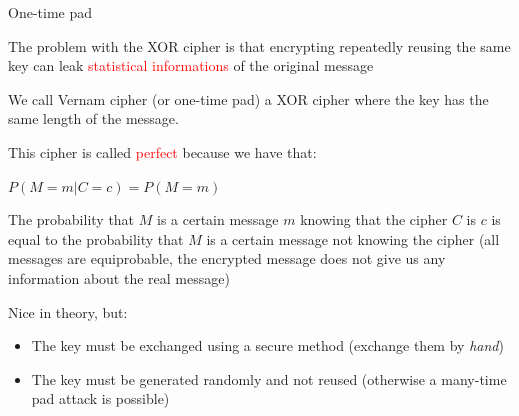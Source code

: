 \begin{frame}{One-time pad}

  \pause

  The problem with the XOR cipher is that encrypting repeatedly reusing the same key can leak \textcolor{red}{statistical informations} of the original message  
  
  \medskip
  
  We call Vernam cipher (or one-time pad) a XOR cipher where the key has the same length of the message. 
  
  \smallskip
  
  This cipher is called \textcolor{red}{perfect} because we have that:
  
  \medskip
  
  \phantom{pad}$P(M = m | C = c) = P(M = m)$
  
  \medskip
  
  The probability that $M$ is a certain message $m$ knowing that the cipher $C$ is $c$ is equal to the probability that $M$ is a certain message not knowing the cipher (all messages are equiprobable, the encrypted message does not give us any information about the real message)
  
  \medskip
  
  \pause

  Nice in theory, but:
  
  \begin{itemize}
    \item The key must be exchanged using a secure method (exchange them by \textit{hand})
    \item The key must be generated randomly and not reused (otherwise a many-time pad attack is possible)
  \end{itemize}

\end{frame}

